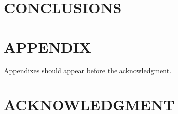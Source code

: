 \documentclass[letterpaper, 10 pt, conference]{ieeeconf}  %
\begin{document}

\section{CONCLUSIONS}








\section*{APPENDIX}

Appendixes should appear before the acknowledgment.

\section*{ACKNOWLEDGMENT}

\end{document}
